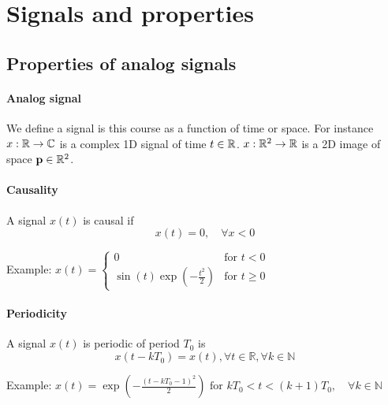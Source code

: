 
\section{Signals and properties}

\subsection{Properties of analog signals}

\paragraph{Analog signal} We define a signal is this course as a function of
time or space. For instance $x:\mathbb{R}\rightarrow\mathbb{C}$ is a complex 1D signal of time
$t\in\mathbb{R}$. $x:\mathbb{R}^2\rightarrow\mathbb{R}$ is a 2D image of space $\mathbf{p}\in\mathbb{R}^2$.

\paragraph{Causality}
A signal $x(t)$ is causal if 
$$ x(t)=0,\quad \forall x<0 $$

Example: $x(t)= \begin{cases}
0& \text{for } t<0\\
\sin(t)\exp\left(-\frac{t^2}{2}\right) & \text{for } t\geq 0
\end{cases}$

\paragraph{Periodicity}
A signal $x(t)$ is periodic of period $T_0$ is
$$x(t-kT_0)=x(t),  \forall t\in\mathbb{R}, \forall k\in\mathbb{N}$$      


Example: $x(t)= %
  \exp\left(-\frac{(t-kT_0-1)^2}{2}\right)  \text{ for }kT_0<t<(k+1)T_0,\quad
  \forall k\in\mathbb{N}$
  
